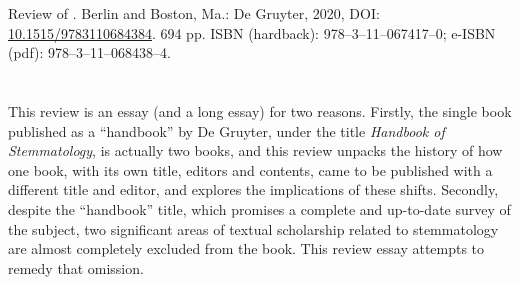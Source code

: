 


\begin{review}
\renewcommand*{\pagemark}{}

\begin{reviewed}
Review of \thecontribution. Berlin and Boston, Ma.: De
Gruyter, 2020, DOI: \href{https://doi.org/10.1515/9783110684384}{10.1515/9783110684384}. 694
pp. ISBN (hardback): 978--3--11--067417--0; e-ISBN (pdf):
978--3--11--068438--4.
\end{reviewed}



\section*{} 
This review is an essay (and a long essay) for two reasons.
Firstly, the single book published as a ``handbook'' by De Gruyter,
under the title \emph{Handbook of Stemmatology}, is actually two books,
and this review unpacks the history of how one book, with its own title,
editors and contents, came to be published with a different title and
editor, and explores the implications of these shifts. Secondly, despite
the ``handbook'' title, which promises a complete and up-to-date survey
of the subject, two significant areas of textual scholarship related to
stemmatology are almost completely excluded from the book. This review
essay attempts to remedy that omission.


\end{review}
